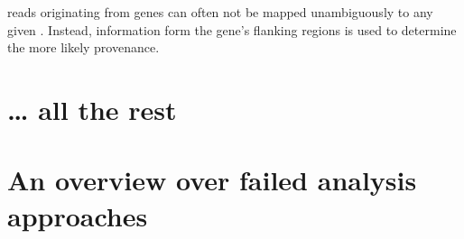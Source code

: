     {\chip reads originating from \trna genes can often not be mapped
    unambiguously to any given \trna. Instead, information form the gene’s
    flanking regions is used to determine the more likely provenance.}

\section{… all the rest}

\section{An overview over failed analysis approaches}
